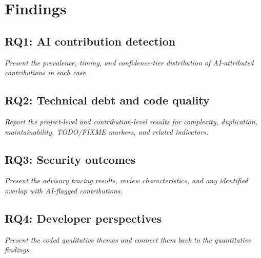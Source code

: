 \chapter{Findings}
\label{ch:findings}

\section{RQ1: AI contribution detection}
\textit{Present the prevalence, timing, and confidence-tier distribution of AI-attributed contributions in each case.}

\section{RQ2: Technical debt and code quality}
\textit{Report the project-level and contribution-level results for complexity, duplication, maintainability, TODO/FIXME markers, and related indicators.}

\section{RQ3: Security outcomes}
\textit{Present the advisory tracing results, review characteristics, and any identified overlap with AI-flagged contributions.}

\section{RQ4: Developer perspectives}
\textit{Present the coded qualitative themes and connect them back to the quantitative findings.}

